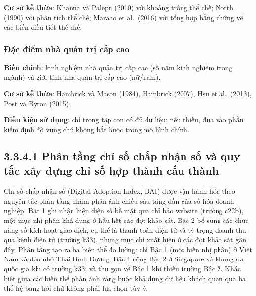 \documentclass[
  a4paper,
  13pt]{extreport}
\begin{document}
\textbf{Cơ sở kế thừa}: Khanna và Palepu (2010) với khoảng trống thể
chế; North (1990) với phân tích thể chế; Marano et al.~(2016) với tổng
hợp bằng chứng về các biến điều tiết thể chế.

\hypertarget{ux111ux1eb7c-ux111iux1ec3m-nhuxe0-quux1ea3n-trux1ecb-cux1ea5p-cao}{%
\subsubsection{Đặc điểm nhà quản trị cấp
cao}\label{ux111ux1eb7c-ux111iux1ec3m-nhuxe0-quux1ea3n-trux1ecb-cux1ea5p-cao}}

\textbf{Biến chính}: kinh nghiệm nhà quản trị cấp cao (số năm kinh
nghiệm trong ngành) và giới tính nhà quản trị cấp cao (nữ/nam).

\textbf{Cơ sở kế thừa}: Hambrick và Mason (1984), Hambrick (2007), Hsu
et al.~(2013), Post và Byron (2015).

\textbf{Điều kiện sử dụng}: chỉ trong tập con có đủ dữ liệu; nếu thiếu,
đưa vào phần kiểm định độ vững chứ không bắt buộc trong mô hình chính.

\hypertarget{phuxe2n-tux1ea7ng-chux1ec9-sux1ed1-chux1ea5p-nhux1eadn-sux1ed1-vuxe0-quy-tux1eafc-xuxe2y-dux1ef1ng-chux1ec9-sux1ed1-hux1ee3p-thuxe0nh-cux1ea5u-thuxe0nh}{%
\subsection{3.3.4.1 Phân tầng chỉ số chấp nhận số và quy tắc xây dựng
chỉ số hợp thành cấu
thành}\label{phuxe2n-tux1ea7ng-chux1ec9-sux1ed1-chux1ea5p-nhux1eadn-sux1ed1-vuxe0-quy-tux1eafc-xuxe2y-dux1ef1ng-chux1ec9-sux1ed1-hux1ee3p-thuxe0nh-cux1ea5u-thuxe0nh}}

Chỉ số chấp nhận số (Digital Adoption Index, DAI) được vận hành hóa theo
nguyên tắc phân tầng nhằm phản ánh chiều sâu tăng dần của số hóa doanh
nghiệp. Bậc 1 ghi nhận hiện diện số bề mặt qua chỉ báo website (trường
c22b), một mục nhị phân khả dụng ở hầu hết các đợt khảo sát. Bậc 2 bổ
sung các chức năng số kích hoạt giao dịch, cụ thể là thanh toán điện tử
và tỷ trọng doanh thu qua kênh điện tử (trường k33), những mục chỉ xuất
hiện ở các đợt khảo sát gần đây. Phân tầng tạo ra ba biến thể đo lường:
chỉ Bậc 1 (một biến nhị phân) ở Việt Nam và đảo nhỏ Thái Bình Dương; Bậc
1 cộng Bậc 2 ở Singapore và khung đa quốc gia khi có trường k33; và thu
gọn về Bậc 1 khi thiếu trường Bậc 2. Khác biệt giữa các biến thể phản
ánh ràng buộc khả dụng dữ liệu khách quan qua ba thế hệ bảng hỏi chứ
không phải lựa chọn tùy ý.
\end{document}
